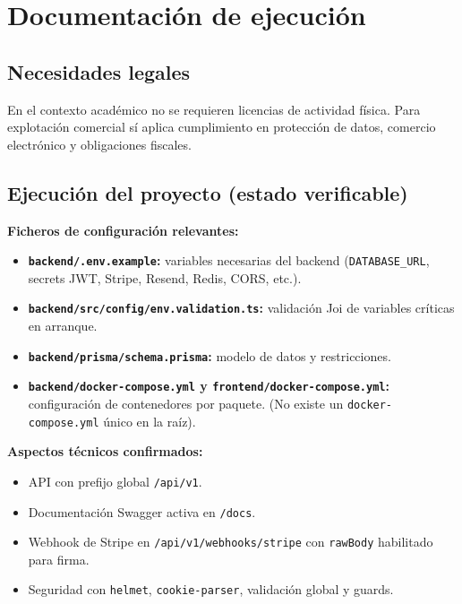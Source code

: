 \documentclass[
  11pt,
  a4paper,
  twoside=false,
  parskip=half               %
]{scrreprt}                  %
\providecommand{\tightlist}{%
  \setlength{\itemsep}{0pt}\setlength{\parskip}{0pt}}
\begin{document}
\hypertarget{documentaciuxf3n-de-ejecuciuxf3n}{%
\section{Documentación de
ejecución}\label{documentaciuxf3n-de-ejecuciuxf3n}}

\hypertarget{necesidades-legales}{%
\subsection{Necesidades legales}\label{necesidades-legales}}

En el contexto académico no se requieren licencias de actividad física.
Para explotación comercial sí aplica cumplimiento en protección de
datos, comercio electrónico y obligaciones fiscales.

\hypertarget{ejecuciuxf3n-del-proyecto-estado-verificable}{%
\subsection{Ejecución del proyecto (estado
verificable)}\label{ejecuciuxf3n-del-proyecto-estado-verificable}}

\textbf{Ficheros de configuración relevantes:}

\begin{itemize}
\tightlist
\item
  \textbf{\texttt{backend/.env.example}:} variables necesarias del
  backend (\texttt{DATABASE\_URL}, secrets JWT, Stripe, Resend, Redis,
  CORS, etc.).
\item
  \textbf{\texttt{backend/src/config/env.validation.ts}:} validación Joi
  de variables críticas en arranque.
\item
  \textbf{\texttt{backend/prisma/schema.prisma}:} modelo de datos y
  restricciones.
\item
  \textbf{\texttt{backend/docker-compose.yml} y
  \texttt{frontend/docker-compose.yml}:} configuración de contenedores
  por paquete. (No existe un \texttt{docker-compose.yml} único en la
  raíz).
\end{itemize}

\textbf{Aspectos técnicos confirmados:}

\begin{itemize}
\tightlist
\item
  API con prefijo global \texttt{/api/v1}.
\item
  Documentación Swagger activa en \texttt{/docs}.
\item
  Webhook de Stripe en \texttt{/api/v1/webhooks/stripe} con
  \texttt{rawBody} habilitado para firma.
\item
  Seguridad con \texttt{helmet}, \texttt{cookie-parser}, validación
  global y guards.
\end{itemize}
\end{document}

